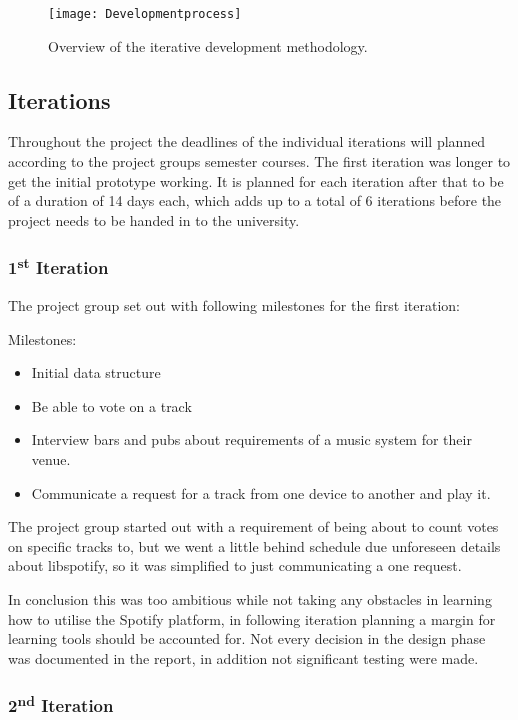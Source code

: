 \begin{figure}[hbtp]
  \centering
  \texttt{[image: Developmentprocess]}
  \caption{Overview of the iterative development methodology.}\label{fig:developmentprocess}
\end{figure}

\subsection{Iterations}

Throughout the project the deadlines of the individual iterations will planned according to the project groups semester courses. The first iteration was longer to get the initial prototype working. It is planned for each iteration after that to be of a duration of 14 days each, which adds up to a total of 6 iterations before the project needs to be handed in to the university.

\subsubsection{1\textsuperscript{st} Iteration}

	The project group set out with following milestones for the first iteration:

	Milestones:
	\begin{itemize}
		\item Initial data structure
		\item Be able to vote on a track
		\item Interview bars and pubs about requirements of a music system for their venue.
		\item Communicate a request for a track from one device to another and play it.
	\end{itemize}

	The project group started out with a requirement of being about to count votes on specific tracks to, but we went a little behind schedule due unforeseen details about libspotify, so it was simplified to just communicating a one request.

	In conclusion this was too ambitious while not taking any obstacles in learning how to utilise the Spotify platform, in following iteration planning a margin for learning tools should be accounted for. Not every decision in the design phase was documented in the report, in addition not significant testing were made.

\subsubsection{2\textsuperscript{nd} Iteration}

